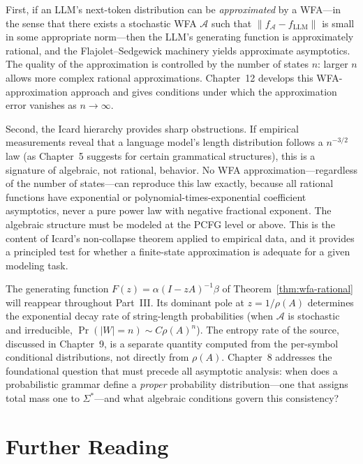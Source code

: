First, if an LLM's next-token distribution can be \emph{approximated} by a WFA---in the sense that there exists a stochastic WFA $\mathcal{A}$ such that $\|f_{\mathcal{A}} - f_{\mathrm{LLM}}\|$ is small in some appropriate norm---then the LLM's generating function is approximately rational, and the Flajolet--Sedgewick machinery yields approximate asymptotics. The quality of the approximation is controlled by the number of states $n$: larger $n$ allows more complex rational approximations. Chapter~12 develops this WFA-approximation approach and gives conditions under which the approximation error vanishes as $n \to \infty$.

Second, the Icard hierarchy provides sharp obstructions. If empirical measurements reveal that a language model's length distribution follows a $n^{-3/2}$ law (as Chapter~5 suggests for certain grammatical structures), this is a signature of algebraic, not rational, behavior. No WFA approximation---regardless of the number of states---can reproduce this law exactly, because all rational functions have exponential or polynomial-times-exponential coefficient asymptotics, never a pure power law with negative fractional exponent. The algebraic structure must be modeled at the PCFG level or above. This is the content of Icard's non-collapse theorem applied to empirical data, and it provides a principled test for whether a finite-state approximation is adequate for a given modeling task.

The generating function $F(z) = \alpha(I - zA)^{-1}\beta$ of Theorem~\ref{thm:wfa-rational} will reappear throughout Part~III. Its dominant pole at $z = 1/\rho(A)$ determines the exponential decay rate of string-length probabilities (when $\mathcal{A}$ is stochastic and irreducible, $\Pr(|W|=n) \sim C\rho(A)^n$). The entropy rate of the source, discussed in Chapter~9, is a separate quantity computed from the per-symbol conditional distributions, not directly from $\rho(A)$. Chapter~8 addresses the foundational question that must precede all asymptotic analysis: when does a probabilistic grammar define a \emph{proper} probability distribution---one that assigns total mass one to $\Sigma^*$---and what algebraic conditions govern this consistency?

\section*{Further Reading}

